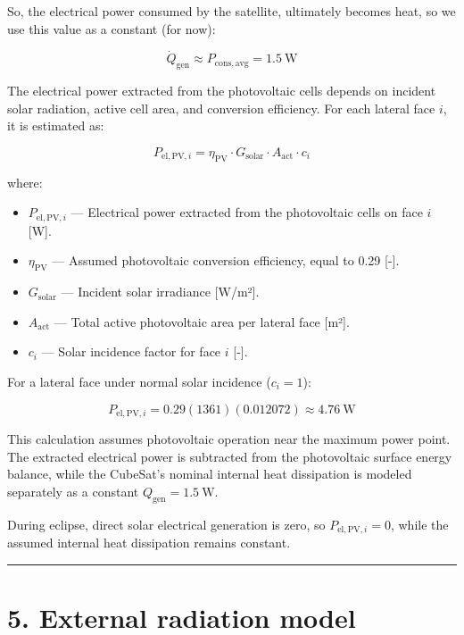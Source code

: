 \documentclass[
]{book}
\providecommand{\tightlist}{%
  \setlength{\itemsep}{0pt}\setlength{\parskip}{0pt}}
\begin{document}
So, the electrical power consumed by the satellite, ultimately becomes heat, so we use this value as a constant (for now):

\[
\boxed{\dot Q_{\mathrm{gen}}\approx P_{\mathrm{cons,avg}}=1.5\ \mathrm{W}}
\]

The electrical power extracted from the photovoltaic cells depends on incident solar radiation, active cell area, and conversion efficiency. For each lateral face \(i\), it is estimated as:

\[P_{\mathrm{el,PV},i} = \eta_{\mathrm{PV}} \cdot G_{\mathrm{solar}} \cdot A_{\mathrm{act}} \cdot c_i\]

where:

\begin{itemize}
\tightlist
\item
  \(P_{\mathrm{el,PV},i}\) --- Electrical power extracted from the photovoltaic cells on face \(i\) {[}W{]}.
\item
  \(\eta_{\mathrm{PV}}\) --- Assumed photovoltaic conversion efficiency, equal to 0.29 {[}-{]}.
\item
  \(G_{\mathrm{solar}}\) --- Incident solar irradiance {[}W/m²{]}.
\item
  \(A_{\mathrm{act}}\) --- Total active photovoltaic area per lateral face {[}m²{]}.
\item
  \(c_i\) --- Solar incidence factor for face \(i\) {[}-{]}.
\end{itemize}

For a lateral face under normal solar incidence (\(c_i=1\)):

\[
P_{\mathrm{el,PV},i}
= 0.29(1361)(0.012072)
\approx 4.76\ \mathrm{W}
\]

This calculation assumes photovoltaic operation near the maximum power point. The extracted electrical power is subtracted from the photovoltaic surface energy balance, while the CubeSat's nominal internal heat dissipation is modeled separately as a constant \(Q_{\mathrm{gen}}=1.5\ \mathrm{W}\).

During eclipse, direct solar electrical generation is zero, so \(P_{\mathrm{el,PV},i}=0\), while the assumed internal heat dissipation remains constant.

\begin{center}\rule{0.5\linewidth}{0.5pt}\end{center}

\section{5. External radiation model}\label{external-radiation-model}
\end{document}
